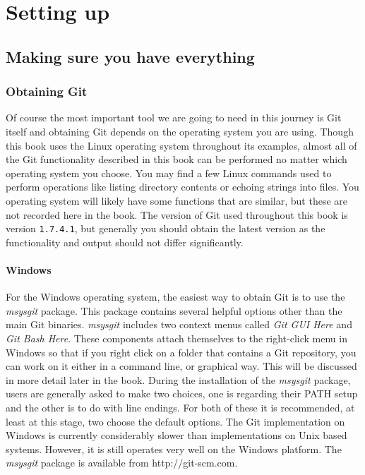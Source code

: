 \cleardoublepage
\chapter{Setting up}
\section{Making sure you have everything}
\subsection{Obtaining Git}
Of course the most important tool we are going to need in this journey is Git itself and obtaining Git depends on the operating system you are using.
Though this book uses the Linux operating system throughout its examples,
almost all of the Git functionality described in this book can be performed no matter which operating system you choose.
You may find a few Linux commands used to perform operations like listing directory contents or echoing strings into files.
You operating system will likely have some functions that are similar, but these are not recorded here in the book.
The version of Git used throughout this book is version \texttt{1.7.4.1},
but generally you should obtain the latest version as the functionality and output should not differ significantly.

\subsubsection{Windows}
For the Windows operating system, the easiest way to obtain Git is to use the \emph{msysgit} package.
This package contains several helpful options other than the main Git binaries.
\emph{msysgit} includes two context menus called \emph{Git GUI Here} and \emph{Git Bash Here}.
These components attach themselves to the right-click menu in Windows so that if you right click on a folder that contains a Git repository,
you can work on it either in a command line, or graphical way.
This will be discussed in more detail later in the book.
During the installation of the \emph{msysgit} package, users are generally asked to make two choices, one is regarding their PATH setup and the other is to do with line endings.
For both of these it is recommended, at least at this stage, two choose the default options.
The Git implementation on Windows is currently considerably slower than implementations on Unix based systems.
However, it is still operates very well on the Windows platform.
The \emph{msysgit} package is available from http://git-scm.com.

